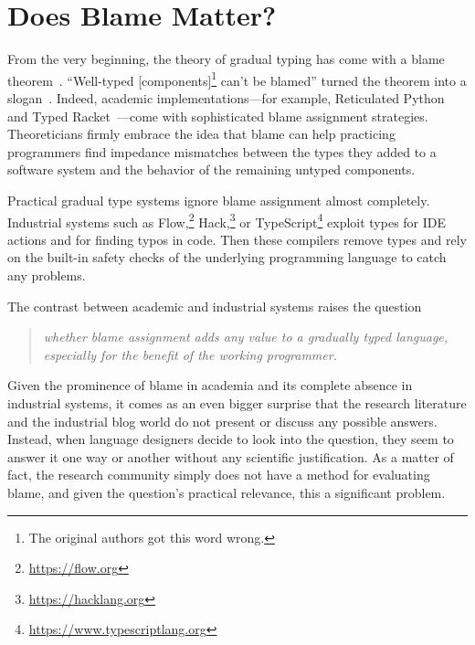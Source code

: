 \section{Does Blame Matter?} \label{sec:introduction}

From the very beginning, the theory of gradual typing has come with a blame
theorem~\cite{mf-toplas-2009, tf-dls-2006}. ``Well-typed [components]\footnote{The
original authors got this word wrong.} can't be blamed'' turned the theorem into a
slogan~\cite{wf-esop-2009}. Indeed, academic implementations---for example,
Reticulated Python~\cite{vsc-dls-2019, vss-popl-2017, vksb-dls-2014} and Typed
Racket~\cite{tf-dls-2006,tf-popl-2008,tfffgksst-snapl-2017,tf-icfp-2010}---come
with sophisticated blame assignment strategies. Theoreticians firmly embrace the
idea that blame can help practicing programmers find impedance mismatches between
the types they added to a software system and the behavior of the remaining untyped
components.

Practical gradual type systems ignore blame assignment almost completely.
Industrial systems such as Flow,\footnote{\url{https://flow.org}}
Hack,\footnote{\url{https://hacklang.org}} or
TypeScript\footnote{\url{https://www.typescriptlang.org}} exploit types for IDE actions and for finding typos in
code. Then these compilers remove types and rely on the built-in safety checks of
the underlying programming language to catch any problems.

The contrast between academic and industrial systems raises the question 
\begin{quote}
 \it
 whether blame assignment adds any value to a gradually typed language, \\
 especially for the benefit of the working programmer.
\end{quote}
Given the prominence of blame in academia and its complete absence in
industrial systems, it comes as an even bigger surprise that the research
literature and the industrial blog world do not present or discuss any
possible answers.  Instead, when language designers decide to look into the
question, they seem to answer it one way or another without any scientific
justification. As a matter of fact, the research community simply does not have a
method for evaluating blame, and given the question's practical
relevance, this a significant problem.

